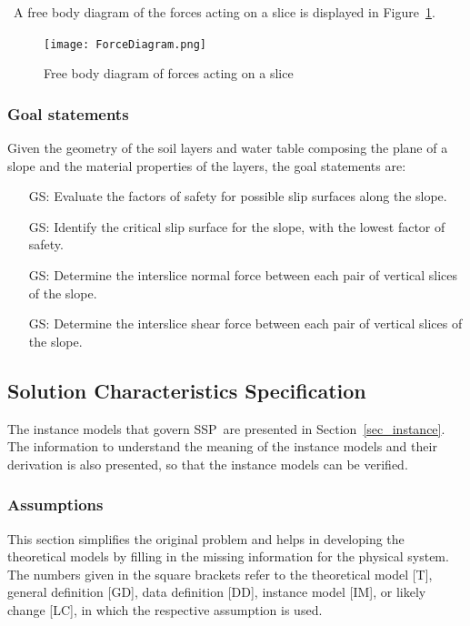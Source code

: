 \documentclass[12pt]{article}
\newcommand{\progname}{SSP}
\newcounter{goalnum} %
\begin{document}
~\newline\noindent A free body diagram of the forces acting on a
slice is displayed in Figure~\ref{Fig_Forces}.

\begin{figure}[h!]
\begin{center}
{
 \texttt{[image: ForceDiagram.png]}
}
\caption{Free body diagram of forces acting on a slice}
\label{Fig_Forces}
\end{center}
\end{figure}

\subsubsection{Goal statements}

Given the geometry of the soil layers and water table composing the plane of a 
slope and the material properties of the layers, the goal statements are:

\begin{itemize}
\item [GS\refstepcounter{goalnum}\thegoalnum: \label{G_FS}]
  {Evaluate the factors of safety for possible slip surfaces along the slope.}
  
\item [GS\refstepcounter{goalnum}\thegoalnum: \label{G_Critical}]
  {Identify the critical slip surface for the slope, with the lowest factor of 
  safety.}

\item [GS\refstepcounter{goalnum}\thegoalnum: \label{G_Normal}]
  {Determine the interslice normal force between each pair of vertical slices   
  of the slope.}
  
\item [GS\refstepcounter{goalnum}\thegoalnum: \label{G_Shear}]
  {Determine the interslice shear force between each pair of vertical slices of 
  the slope.} 
\end{itemize}

\subsection{Solution Characteristics Specification}

The instance models that govern \progname\ are presented in
Section~\ref{sec_instance}.  The information to understand the
meaning of the instance models and their derivation is also presented,
so that the instance models can be verified.

\subsubsection{Assumptions}
\label{Assumptions}
This section simplifies the original problem and helps in developing the
theoretical models by filling in the missing information for the physical
system. The numbers given in the square brackets refer to the theoretical model
[T], general definition [GD], data definition [DD], instance model [IM], or
likely change [LC], in which the respective assumption is used.
\end{document}
